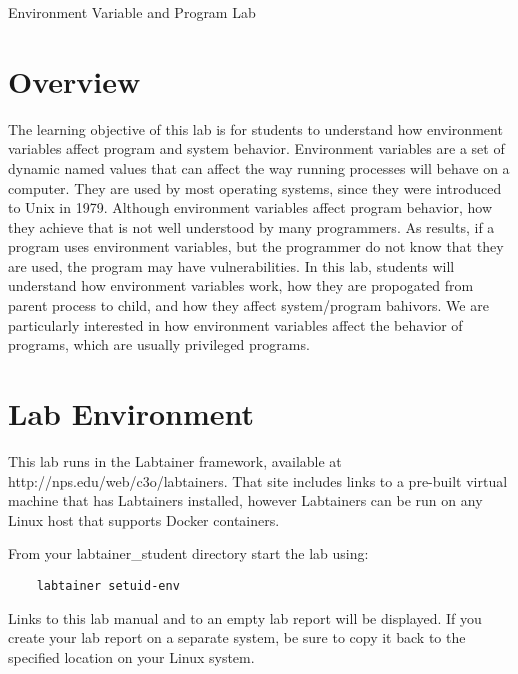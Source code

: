 








\begin{center}
{\LARGE Environment Variable and \setuid Program Lab}
\end{center}

\copyrightnotice


\section{Overview}

The learning objective of this lab is for students to understand how
environment variables affect program and system behavior. Environment
variables are a set of dynamic named values that can affect the way running processes
will behave on a computer. They are used by most operating systems, since
they were introduced to Unix in 1979. Although environment variables affect
program behavior, how they achieve that is not well understood by many
programmers. As results, if a program uses  environment
variables,  but the programmer do not know that they are used, the program
may have vulnerabilities. In this lab, students will understand how
environment variables work, how they are propogated from parent process to
child, and how they affect system/program bahivors. We are particularly
interested in how environment variables affect the behavior of \setuid
programs, which are usually privileged programs. 

\section{Lab Environment}

This lab runs in the Labtainer framework,
available at http://nps.edu/web/c3o/labtainers.
That site includes links to a pre-built virtual machine
that has Labtainers installed, however Labtainers can 
be run on any Linux host that supports Docker containers.

From your labtainer_student directory start the lab using:
\begin{verbatim}
    labtainer setuid-env
\end{verbatim}
Links to this lab manual and to an empty lab report will be displayed.  If you create your lab report on a separate system, 
be sure to copy it back to the specified location on your Linux system. 



